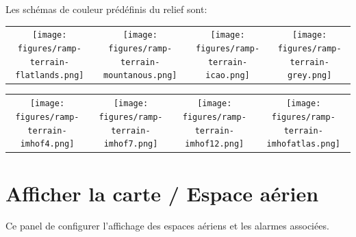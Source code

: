 Les schémas de couleur prédéfinis du relief sont:

\begin{longtable}{c c c c}
\texttt{[image: figures/ramp-terrain-flatlands.png]}&
\texttt{[image: figures/ramp-terrain-mountanous.png]}&
\texttt{[image: figures/ramp-terrain-icao.png]}&
\texttt{[image: figures/ramp-terrain-grey.png]}
\end{longtable}

\begin{longtable}{c c c c}
\texttt{[image: figures/ramp-terrain-imhof4.png]}&
\texttt{[image: figures/ramp-terrain-imhof7.png]}&
\texttt{[image: figures/ramp-terrain-imhof12.png]}&
\texttt{[image: figures/ramp-terrain-imhofatlas.png]}
\end{longtable}


\section{Afficher la carte / Espace aérien}

Ce panel de configurer l'affichage des espaces aériens et les alarmes associées.

